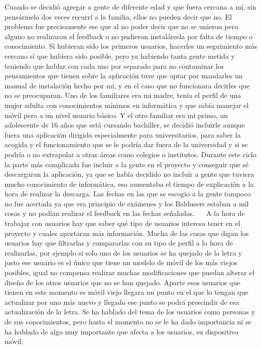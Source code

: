 Cuando se decidió agregar a gente de diferente edad y que fuera cercana a mí, sin pensármelo dos veces recurrí a la familia, ellos no pueden decir que no.
El problema fue precisamente ese que al no poder decir que no se unieron pero alguno no realizaron el feedback o no pudieron instalársela por falta de tiempo o conocimiento.
Si hubieran sido los primeros usuarios, hacerles un seguimiento más cercano sí que hubiera sido posible, pero ya habiendo tanta gente metida y teniendo que hablar con cada uno por separado para no contaminar los pensamientos que tienen sobre la aplicación tuve que optar por mandarles un manual de instalación hecho por mí, y en el caso que no funcionara decirles que no se preocuparan.
Uno de los familiares era mi madre, tenía el perfil de una mujer adulta con conocimientos mínimos en informática y que sabía manejar el móvil pero a un nivel usuario básico.
Y el otro familiar era mi primo, un adolescente de 16 años que está cursando bachiller, se decidió incluirle aunque fuera una aplicación dirigida especialmente para universitarios, para saber la acogida y el funcionamiento que se le podría dar fuera de la universidad y si se podría o no extrapolar a otras áreas como colegios o institutos.
Durante este ciclo la parte más complicada fue incluir a la gente en el proyecto y conseguir que sé descargaran la aplicación, ya que se había decidido no incluir a gente que tuviera mucho conocimiento de informática, eso aumentaba el tiempo de explicación a la hora de realizar la descarga.
Las fechas en las que se escogio a la gente tampoco no fue acertada ya que era principio de exámenes y los Baldusers estaban a mil cosas y no podían realizar el feedback en las fechas señaladas.
 
A la hora de trabajar con usuarios hay que saber qué tipo de usuarios interesa tener en el proyecto y cuales aportaran más información.
Mucha de las cosas que digan los usuarios hay que filtrarlas y compararlas con su tipo de perfil a la hora de realizarlas, por ejemplo si solo uno de los usuarios se ha quejado de la letra y justo ese usuario es el único que tiene un modelo de móvil de los más viejos posibles, igual no compensa realizar muchas modificaciones que puedan alterar el diseño de los otros usuarios que no se han quejado. Aparte esos usuarios que tienen en este momento es móvil viejo llegara un punto en el que lo tengan que actualizar por uno más nuevo y llegado ese punto se podrá prescindir de esa actualización de la letra.
Se ha hablado del tema de los usuarios como personas y de sus conocimientos, pero hasta el momento no se le ha dado importancia ni se ha hablado de algo muy importante que afecta a los usuarios, su dispositivo móvil. 
